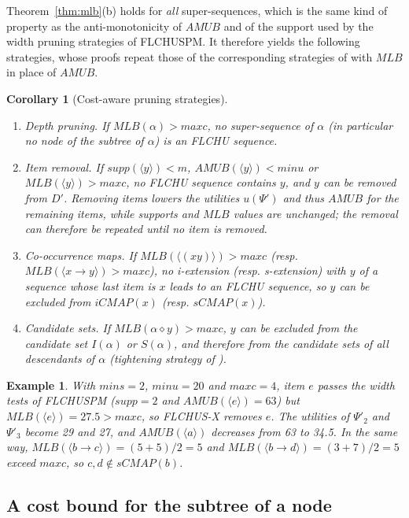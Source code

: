 \documentclass[pdflatex,sn-mathphys,Numbered]{sn-jnl}
\theoremstyle{thmstyleone}
\newtheorem{corollary}[theorem]{Corollary}
\theoremstyle{thmstyletwo}
\newtheorem{example}{Example}
\theoremstyle{thmstylethree}
\newcommand{\FL}{\textsc{FLCHUSPM}}
\newcommand{\FX}{\textsc{FLCHUS-X}}
\newcommand{\amub}{\ensuremath{\mathit{AMUB}}}
\newcommand{\mlb}{\ensuremath{\mathit{MLB}}}
\newcommand{\supp}{\ensuremath{\mathit{supp}}}
\newcommand{\minu}{\ensuremath{\mathit{minu}}}
\newcommand{\maxc}{\ensuremath{\mathit{maxc}}}
\newcommand{\mins}{\ensuremath{\mathit{mins}}}
\newcommand{\seq}[1]{\langle #1\rangle}
\begin{document}
Theorem~\ref{thm:mlb}(b) holds for \emph{all} super-sequences, which is the same kind of
property as the anti-monotonicity of \amub{} and of the support used by the width pruning
strategies of \FL{}. It therefore yields the following strategies, whose proofs repeat those
of the corresponding strategies of \cite[Section~4.3]{truong2022} with \mlb{} in place of
\amub{}.

\begin{corollary}[Cost-aware pruning strategies]\label{cor:strategies}
\begin{enumerate}
\item \emph{Depth pruning.} If $\mlb(\alpha) > \maxc$, no super-sequence of $\alpha$ (in
  particular no node of the subtree of $\alpha$) is an FLCHU sequence.
\item \emph{Item removal.} If $\supp(\seq{y}) < m$, $\amub(\seq{y}) < \minu$ or
  $\mlb(\seq{y}) > \maxc$, no FLCHU sequence contains $y$, and $y$ can be removed from $D'$.
  Removing items lowers the utilities $u(\Psi')$ and thus \amub{} for the remaining items,
  while supports and \mlb{} values are unchanged; the removal can therefore be repeated until
  no item is removed.
\item \emph{Co-occurrence maps.} If $\mlb(\seq{(xy)}) > \maxc$ (resp.
  $\mlb(\seq{x \to y}) > \maxc$), no i-extension (resp. s-extension) with $y$ of a sequence
  whose last item is $x$ leads to an FLCHU sequence, so $y$ can be excluded from
  $\mathit{iCMAP}(x)$ (resp. $\mathit{sCMAP}(x)$).
\item \emph{Candidate sets.} If $\mlb(\alpha \diamond y) > \maxc$, $y$ can be excluded from
  the candidate set $I(\alpha)$ or $S(\alpha)$, and therefore from the candidate sets of all
  descendants of $\alpha$ (tightening strategy of \cite{truong2022}).
\end{enumerate}
\end{corollary}

\begin{example}
With $\mins = 2$, $\minu = 20$ and $\maxc = 4$, item $e$ passes the width tests of \FL{}
($\supp = 2$ and $\amub(\seq{e}) = 63$) but $\mlb(\seq{e}) = 27.5 > \maxc$, so \FX{} removes $e$.
The utilities of $\Psi'_2$ and $\Psi'_3$ become 29 and 27, and $\amub(\seq{a})$ decreases from
63 to 34.5. In the same way, $\mlb(\seq{b \to c}) = (5 + 5)/2 = 5$ and
$\mlb(\seq{b \to d}) = (3 + 7)/2 = 5$ exceed \maxc, so $c, d \notin \mathit{sCMAP}(b)$.
\end{example}

\subsection{A cost bound for the subtree of a node}\label{sec:mdb}
\end{document}
